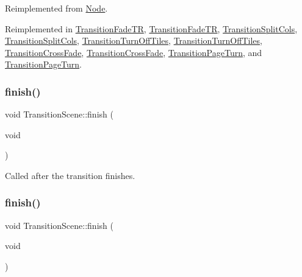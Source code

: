 Reimplemented from \hyperlink{classNode_abcf85087a15901deb7c6c1231634c8ab}{Node}.



Reimplemented in \hyperlink{classTransitionFadeTR_a2bc9e0112e0242feb4279c2f951cb8e3}{Transition\+Fade\+TR}, \hyperlink{classTransitionFadeTR_ae96994b31bd3e6c6bc93b630b5d5edd1}{Transition\+Fade\+TR}, \hyperlink{classTransitionSplitCols_a9f037138c420fcf93178ce48688d4910}{Transition\+Split\+Cols}, \hyperlink{classTransitionSplitCols_af9a2190cb947a62c0d04544cd7db6c5e}{Transition\+Split\+Cols}, \hyperlink{classTransitionTurnOffTiles_adadbe8ec95b4e789ffe4659a7d03fa43}{Transition\+Turn\+Off\+Tiles}, \hyperlink{classTransitionTurnOffTiles_a467ba195c2e7d161fd31436362734968}{Transition\+Turn\+Off\+Tiles}, \hyperlink{classTransitionCrossFade_a5eeb7d0ad58586a1b0971d12275a5460}{Transition\+Cross\+Fade}, \hyperlink{classTransitionCrossFade_a261b721fc33fb8eaa01efeeb3d88db56}{Transition\+Cross\+Fade}, \hyperlink{classTransitionPageTurn_a2df5e0dc13a58e5ac7c8ce27703bd384}{Transition\+Page\+Turn}, and \hyperlink{classTransitionPageTurn_a1e00260a163de7b41a5827ee9ed34d61}{Transition\+Page\+Turn}.

\mbox{\label{classTransitionScene_ae1ce8fa1d0dc4462982ec155d1c6574b}} 
\subsubsection{\texorpdfstring{finish()}{finish()}\hspace{0.1cm}{\footnotesize\ttfamily [1/2]}}
{\footnotesize\ttfamily void Transition\+Scene\+::finish (\begin{DoxyParamCaption}\item[{void}]{ }\end{DoxyParamCaption})}

Called after the transition finishes. \mbox{\label{classTransitionScene_ae1ce8fa1d0dc4462982ec155d1c6574b}} 
\subsubsection{\texorpdfstring{finish()}{finish()}\hspace{0.1cm}{\footnotesize\ttfamily [2/2]}}
{\footnotesize\ttfamily void Transition\+Scene\+::finish (\begin{DoxyParamCaption}\item[{void}]{ }\end{DoxyParamCaption})}

